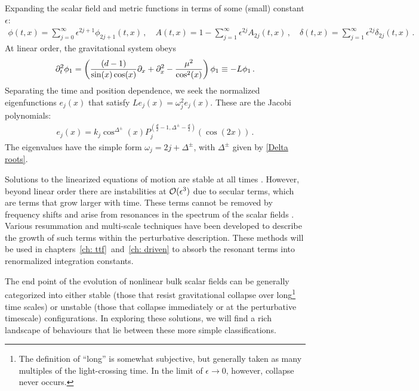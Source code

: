 \documentclass[../PhD.tex]{subfiles}
\begin{document}
Expanding the scalar field and metric functions in terms of some (small) constant $\epsilon$:
\begin{align}
\label{epsilon exp}
\phi(t,x) = \sum_{j=0}^{\infty} \epsilon^{2j + 1} \phi_{2j + 1} (t,x) \, , \quad A(t,x) = 1 - \sum_{j=1}^\infty \epsilon^{2j} A_{2j} (t,x) \, , \quad \delta(t,x) = \sum_{j=1}^\infty \epsilon^{2j} \delta_{2j} (t,x) \, .
\end{align}
At linear order, the gravitational system obeys
\begin{align}
\label{collapse eigen eqn}
\partial_t^2 \phi_1 = \left( \frac{ (d-1)}{\sin (x) \cos (x)} \partial_x + \partial^2_x - \frac{\mu^2}{\cos^2 (x)} \right) \phi_1 \equiv - L \phi_1 \, .
\end{align}
Separating the time and position dependence, we seek the normalized eigenfunctions $e_j(x)$ that satisfy $L e_j(x) = \omega_j^2 e_j(x)$. These are the Jacobi polynomials:
\begin{align}
\label{scalar eigens}
e_j (x) = k_j \cos^{\Delta^\pm}(x) P_j^{(\frac{d}{2} - 1, \Delta^\pm - \frac{d}{2})} \left( \cos \left( 2x \right)\right) \, .
\end{align}
The eigenvalues have the simple form $\omega_j = 2j + \Delta^\pm$, with $\Delta^\pm$ given by \eqref{Delta roots}. 

Solutions to the linearized equations of motion are stable at all times \cite{1506.07907}. However, beyond linear order there are instabilities at $\mathcal O(\epsilon^3)$ due to secular terms, which are terms that grow larger with time. These terms cannot be removed by frequency shifts and arise from resonances in the spectrum of the scalar fields \cite{1407.6273}. Various resummation \cite{hep-th/9506161} and multi-scale techniques \cite{1403.6471} have been developed to describe the growth of such terms within the perturbative description. These methods will be used in chapters~\ref{ch: ttf}~and~\ref{ch: driven} to absorb the resonant terms into renormalized integration constants.

The end point of the evolution of nonlinear bulk scalar fields can be generally categorized into either stable (those that resist gravitational collapse over long\footnote{The definition of ``long'' is somewhat subjective, but generally taken as many multiples of the light-crossing time. In the limit of $\epsilon \to 0$, however, collapse never occurs.} time scales) or unstable (those that collapse immediately or at the perturbative timescale) configurations. In exploring these solutions, we will find a rich landscape of behaviours that lie between these more simple classifications.
\end{document}
